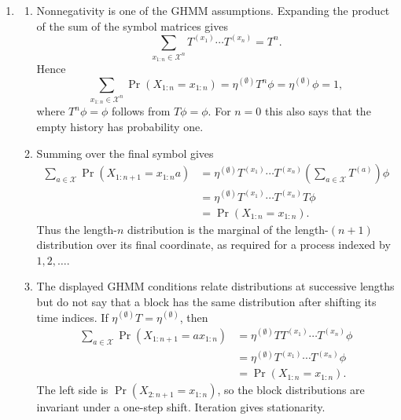 \documentclass[11pt]{article}
\begin{document}
\begin{solution}[ex:p3-4]
    \begin{enumerate}
      \item
        \begin{enumerate}
          \item Nonnegativity is one of the GHMM assumptions. Expanding the
            product of the sum of the symbol matrices gives
            \[
              \sum_{x_{1:n}\in\mathcal X^n}
                T^{(x_1)}\cdots T^{(x_n)}=T^n.
            \]
            Hence
            \[
              \sum_{x_{1:n}\in\mathcal X^n}
                \Pr(X_{1:n}=x_{1:n})
                =\eta^{(\emptyset)}T^n\phi
                =\eta^{(\emptyset)}\phi=1,
            \]
            where $T^n\phi=\phi$ follows from $T\phi=\phi$. For $n=0$
            this also says that the empty history has probability one.

          \item Summing over the final symbol gives
            \[
              \begin{aligned}
                \sum_{a\in\mathcal X}
                  \Pr(X_{1:n+1}=x_{1:n}a)
                  &=
                  \eta^{(\emptyset)}
                    T^{(x_1)}\cdots T^{(x_n)}
                    \left(\sum_{a\in\mathcal X}T^{(a)}\right)\phi\\
                  &=
                  \eta^{(\emptyset)}
                    T^{(x_1)}\cdots T^{(x_n)}T\phi\\
                  &=\Pr(X_{1:n}=x_{1:n}).
              \end{aligned}
            \]
            Thus the length-$n$ distribution is the marginal of the
            length-$(n+1)$ distribution over its final coordinate, as
            required for a process indexed by $1,2,\ldots$.

          \item The displayed GHMM conditions relate distributions at
            successive lengths but do not say that a block has the same
            distribution after shifting its time indices. If
            $\eta^{(\emptyset)}T=\eta^{(\emptyset)}$, then
            \[
              \begin{aligned}
                \sum_{a\in\mathcal X}
                  \Pr(X_{1:n+1}=a x_{1:n})
                  &=
                  \eta^{(\emptyset)}T
                    T^{(x_1)}\cdots T^{(x_n)}\phi\\
                  &=
                  \eta^{(\emptyset)}
                    T^{(x_1)}\cdots T^{(x_n)}\phi\\
                  &=\Pr(X_{1:n}=x_{1:n}).
              \end{aligned}
            \]
            The left side is
            $\Pr(X_{2:n+1}=x_{1:n})$, so the block distributions are
            invariant under a one-step shift. Iteration gives stationarity.
        \end{enumerate}


\end{enumerate}
\end{solution}
\end{document}
